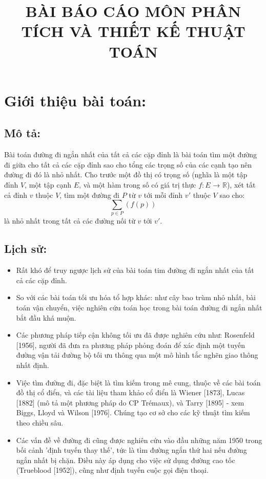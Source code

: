 \documentclass{article}
\title{BÀI BÁO CÁO MÔN PHÂN TÍCH VÀ THIẾT KẾ THUẬT TOÁN}
\begin{document}
\maketitle

\section{Giới thiệu bài toán:}
\subsection{Mô tả:}
\setlength{\parindent}{18pt}
Bài toán đường đi ngắn nhất của tất cả các cặp đỉnh là bài toán tìm một đường đi giữa cho tất cả các cặp đỉnh sao cho tổng các trọng số của các cạnh tạo nên đường đi đó là nhỏ nhất. Cho trước một đồ thị có trọng số (nghĩa là một tập đỉnh $V$, một tập cạnh $E$, và một hàm trong số có giá trị thực $f : E$ → $\mathbb{R}$), xét tất cả đỉnh $v$ thuộc $V$, tìm một đường đi $P$ từ $v$ tới mỗi đỉnh $v'$ thuộc $V$ sao cho:
\newline
$$\displaystyle \sum_{p\in P}(f(p))$$
\newline
là nhỏ nhất trong tất cả các đường nối từ $v$ tới $v'$. 
\subsection{Lịch sử:}
\begin{itemize}
\item Rất khó để truy ngược lịch sử của bài toán tim đường đi ngắn nhất của tất cả các cặp đỉnh.
\item So với các bài toán tối ưu hóa tổ hợp khác: như cây bao trùm nhỏ nhất, bài toán vận chuyển, việc nghiên cứu toán học trong bài toán đường đi ngắn nhất bắt đầu khá muộn.
\item Các phương pháp tiếp cận không tối ưu đã được nghiên cứu như: Rosenfeld [1956], người đã đưa ra phương pháp phỏng đoán để xác định một tuyến đường vận tải đường bộ tối ưu thông qua một mô hình tắc nghẽn giao thông nhất định.
\item Việc tìm đường đi, đặc biệt là tìm kiếm trong mê cung, thuộc về các bài toán đồ thị cổ điển, và các tài liệu tham khảo cổ điển là Wiener [1873], Lucas [1882] (mô tả một phương pháp do CP Trémaux), và Tarry [1895] - xem Biggs, Lloyd và Wilson [1976]. Chúng tạo cơ sở cho các kỹ thuật tìm kiếm theo chiều sâu.
\item Các vấn đề về đường đi cũng được nghiên cứu vào đầu những năm 1950 trong bối cảnh 'định tuyến thay thế', tức là tìm đường ngắn thứ hai nếu đường ngắn nhất bị chặn. Điều này áp dụng cho việc sử dụng đường cao tốc (Trueblood [1952]), cũng như định tuyến cuộc gọi điện thoại.
\end{itemize}
\end{document}

